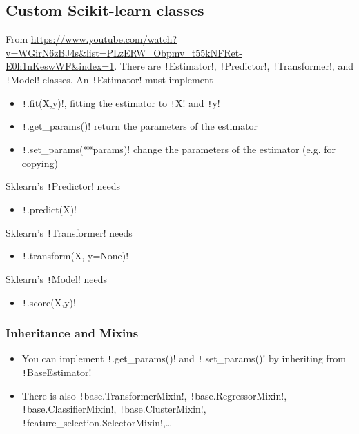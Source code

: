 \documentclass[11pt]{article}
\theoremstyle{definition}
\begin{document}
\subsection{Custom Scikit-learn classes} From \url{https://www.youtube.com/watch?v=WGirN6zBJ4s&list=PLzERW_Obpmv_t55kNFRet-E0h1nKeswWF&index=1}. There are \texttt!Estimator!, \texttt!Predictor!, \texttt!Transformer!, and \texttt!Model! classes. An \texttt!Estimator! must implement 
\begin{itemize}
	\item \texttt!.fit(X,y)!, fitting the estimator to \texttt!X! and \texttt!y!
	\item \texttt!.get_params()! return the parameters of the estimator
	\item \texttt!.set_params(**params)! change the parameters of the estimator (e.g. for copying)
\end{itemize}
Sklearn's \texttt!Predictor! needs 
\begin{itemize}
	\item \texttt!.predict(X)!
\end{itemize}
Sklearn's \texttt!Transformer! needs 
\begin{itemize}
	\item \texttt!.transform(X, y=None)!
\end{itemize}
Sklearn's \texttt!Model! needs 
\begin{itemize}
	\item \texttt!.score(X,y)!
\end{itemize}
\subsubsection{Inheritance and Mixins}
\begin{itemize}
	\item You can implement \texttt!.get_params()! and \texttt!.set_params()! by inheriting from \texttt!BaseEstimator!
	\item There is also \texttt!base.TransformerMixin!, \texttt!base.RegressorMixin!, \texttt!base.ClassifierMixin!,  \texttt!base.ClusterMixin!,  \texttt!feature_selection.SelectorMixin!,\dots
\end{itemize}
\end{document}
